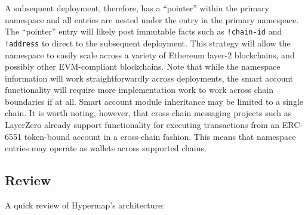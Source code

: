 \documentclass[runningheads]{llncs}
\begin{document}
A subsequent deployment, therefore, has a ``pointer'' within the primary namespace and all entries are nested under the entry in the primary namespace.
The ``pointer'' entry will likely post immutable facts such as \verb|!chain-id| and \verb|!address| to direct to the subsequent deployment.
This strategy will allow the namespace to easily scale across a variety of Ethereum layer-2 blockchains, and possibly other EVM-compliant blockchains.
Note that while the namespace information will work straightforwardly across deployments, the smart account functionality will require more implementation work to work across chain boundaries if at all.
Smart account module inheritance may be limited to a single chain.
It is worth noting, however, that cross-chain messaging projects such as LayerZero already support functionality for executing transactions from an ERC-6551 token-bound account in a cross-chain fashion.
This means that namespace entries may operate as wallets across supported chains.

\subsection{Review}
\label{sec:hypermapreview}

A quick review of Hypermap's architecture:
\end{document}
